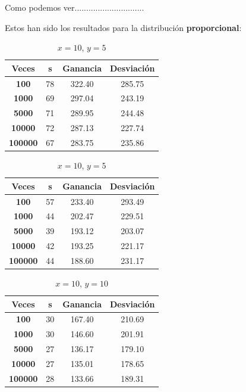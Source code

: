 \documentclass[11pt,a4paper]{report}
\begin{document}
Como podemos ver..............................



Estos han sido los resultados para la distribución \textbf{proporcional}:

\begin{table}[H]
	\parbox{.45\linewidth}{
	\centering
	\begin{tabular}{c|ccc}
	\textbf{Veces} & \textbf{s} & \textbf{Ganancia} & \textbf{Desviación} \\ \hline
	\textbf{100}   & 78         & 322.40            & 285.75			  \\ \hline
	\textbf{1000}  & 69         & 297.04            & 243.19			  \\ \hline
	\textbf{5000}  & 71         & 289.95            & 244.48 			  \\ \hline
	\textbf{10000} & 72         & 287.13            & 227.74			  \\ \hline
	\textbf{100000}& 67         & 283.75            & 235.86			  \\
	\end{tabular}
	\caption{$x=10$, $y=1$}
	}
	\hfill
	\parbox{.45\linewidth}{
	\centering
	\begin{tabular}{c|ccc}
	\textbf{Veces} & \textbf{s} & \textbf{Ganancia} & \textbf{Desviación} \\ \hline
	\textbf{100}   & 57         & 233.40            & 293.49			  \\ \hline
	\textbf{1000}  & 44         & 202.47            & 229.51			  \\ \hline
	\textbf{5000}  & 39         & 193.12            & 203.07 			  \\ \hline
	\textbf{10000} & 42         & 193.25            & 221.17			  \\ \hline
	\textbf{100000}& 44         & 188.60            & 231.17			  \\
	\end{tabular}
	\caption{$x=10$, $y=5$}
	}
\end{table}
\begin{table}[H]
	\centering
	\begin{tabular}{c|ccc}
	\textbf{Veces} & \textbf{s} & \textbf{Ganancia} & \textbf{Desviación} \\ \hline
	\textbf{100}   & 30         & 167.40            & 210.69			  \\ \hline
	\textbf{1000}  & 30         & 146.60            & 201.91			  \\ \hline
	\textbf{5000}  & 27         & 136.17            & 179.10 			  \\ \hline
	\textbf{10000} & 27         & 135.01            & 178.65			  \\ \hline
	\textbf{100000}& 28         & 133.66            & 189.31			  \\
	\end{tabular}
	\caption{$x=10$, $y=10$}
\end{table}
\end{document}
